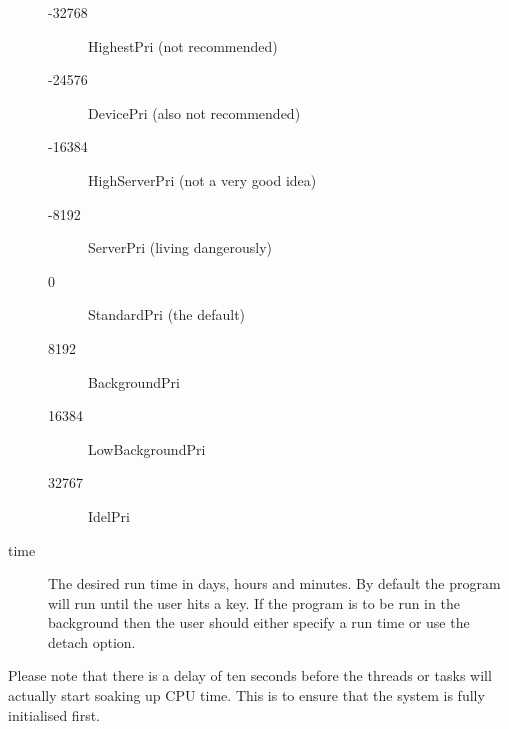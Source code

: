 \begin{description}
\begin{description}
\item [-32768] HighestPri (not recommended)
\item [-24576] DevicePri (also not recommended)
\item [-16384] HighServerPri (not a very good idea)
\item [-8192] ServerPri (living dangerously)
\item [0] StandardPri (the default)
\item [8192] BackgroundPri
\item [16384] LowBackgroundPri
\item [32767] IdelPri
\end{description}

\item [time] The desired run time in days, hours and minutes. By
default the program will run until the user hits a key. If the program is
to be run in the background then the user should either specify a run time
or use the detach option.
\end{description}

Please note that there is a delay of ten seconds before the threads or
tasks will actually start soaking up CPU time. This is to ensure that the
system is fully initialised first.


